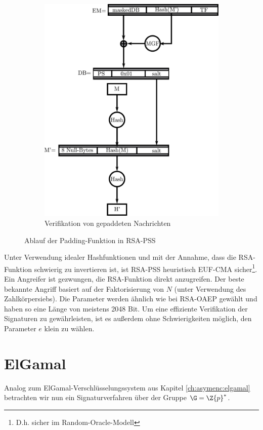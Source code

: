 \begin{figure}[h]
\begin{subfigure}[b]{.45\textwidth}
    \includegraphics[width=\textwidth]{images/pss-vfy.pdf}
    \caption{Verifikation von gepaddeten Nachrichten}
    \label{fig:pss-vfy}  
  \end{subfigure}
  \caption{Ablauf der Padding-Funktion in RSA-PSS}
\end{figure}


Unter Verwendung idealer Hashfunktionen und mit der Annahme, dass die
RSA-Funktion schwierig zu invertieren ist, ist RSA-PSS heuristisch
EUF-CMA sicher\footnote{D.h. sicher im Random-Oracle-Modell}. Ein Angreifer ist gezwungen, die RSA-Funktion direkt anzugreifen. Der beste bekannte Angriff basiert auf der Faktorisierung von $N$ (unter Verwendung des Zahlkörpersiebs). Die Parameter werden ähnlich wie bei RSA-OAEP gewählt und haben so eine Länge von meistens 2048 Bit. Um eine effiziente Verifikation der Signaturen zu gewährleisten, ist es außerdem ohne Schwierigkeiten möglich, den Parameter $e$ klein zu wählen.


\section{ElGamal}
Analog zum ElGamal-Verschlüsselungssystem aus Kapitel
\ref{ch:asymenc:elgamal} betrachten wir nun ein Signaturverfahren über
der Gruppe $\G = \Z{p}^*$.
